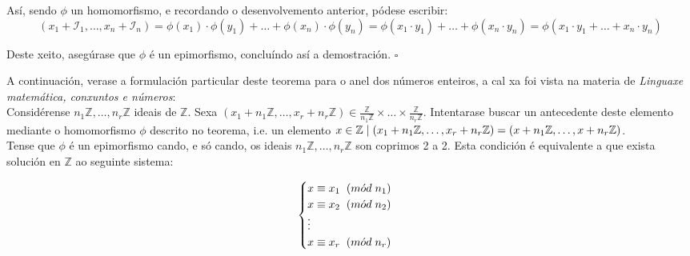 \documentclass[twoside]{report}
\theoremstyle{mystyle}
\begin{document}
\noindent Así, sendo $\phi$ un homomorfismo, e recordando o desenvolvemento anterior, pódese escribir:
$$(x_{1} + \mathcal{I}_{1}, \ldots, x_{n} + \mathcal{I}_{n}) = \phi(x_{1}) \cdot \phi(y_{1}) + \ldots + \phi(x_{n}) \cdot \phi(y_{n}) = \phi(x_{1} \cdot y_{1}) + \ldots + \phi(x_{n} \cdot y_{n}) = \phi(x_{1} \cdot y_{1} + \ldots + x_{n} \cdot y_{n})$$

\noindent Deste xeito, asegúrase que $\phi$ é un epimorfismo, concluíndo así a demostración. $\square$\\

\vspace{3mm}

\noindent A continuación, verase a formulación particular deste teorema para o anel dos números enteiros, a cal xa foi vista na materia de \textit{Linguaxe matemática, conxuntos e números}:\\

\noindent Considérense $n_{1}\mathbb{Z}, \ldots, n_{r}\mathbb{Z}$ ideais de $\mathbb{Z}$. Sexa $(x_{1} + n_{1}\mathbb{Z}, \ldots, x_{r} + n_{r}\mathbb{Z}) \in \displaystyle \frac{\mathbb{Z}}{n_{1}\mathbb{Z}} \times \ldots \times \displaystyle \frac{\mathbb{Z}}{n_{r}\mathbb{Z}}$. Intentarase buscar un antecedente deste elemento mediante o homomorfismo $\phi$ descrito no teorema, i.e. un elemento $x \in \mathbb{Z} \hspace{1mm} | \hspace{1mm} (x_{1} + n_{1}\mathbb{Z}, \ldots, x_{r} + n_{r}\mathbb{Z}) = (x + n_{1}\mathbb{Z}, \ldots, x + n_{r}\mathbb{Z})$.\\

\noindent Tense que $\phi$ é un epimorfismo cando, e só cando, os ideais $n_{1}\mathbb{Z}, \ldots, n_{r}\mathbb{Z}$ son coprimos 2 a 2. Esta condición é equivalente a que exista solución en $\mathbb{Z}$ ao seguinte sistema:

$$
\begin{cases}
x \equiv x_{1} \hspace{2mm} (m\acute{o}d \hspace{1mm} n_{1})\\
x \equiv x_{2} \hspace{2mm} (m\acute{o}d \hspace{1mm} n_{2})\\
\vdots \\
x \equiv x_{r} \hspace{2mm} (m\acute{o}d \hspace{1mm} n_{r})
\end{cases}
$$
\end{document}
